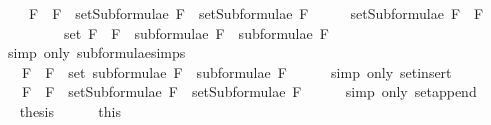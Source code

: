 \begin{isabellebody}
\ \ \ {\isacharequal}\ {\isacharbraceleft}F{}\ \isactrlbold {\isasymand}\ F{}{\isacharbraceright}\ {\isasymunion}\ {\isacharparenleft}setSubformulae\ F{}\ {\isasymunion}\ setSubformulae\ F{}{\isacharparenright}{\isachardoublequoteclose}\isanewline
%
\isadelimproof
%
\endisadelimproof
%
\isatagproof
{}\isamarkupfalse%
\ {\isacharminus}\isanewline
\ \ \isamarkupfalse%
\ {\isachardoublequoteopen}setSubformulae\ {\isacharparenleft}F{}\ \isactrlbold {\isasymand}\ F{}{\isacharparenright}\ \isanewline
\ \ \ \ \ \ \ \ {\isacharequal}\ set\ {\isacharparenleft}{\isacharparenleft}F{}\ \isactrlbold {\isasymand}\ F{}{\isacharparenright}\ {\isacharhash}\ {\isacharparenleft}subformulae\ F{}\ {\isacharat}\ subformulae\ F{}{\isacharparenright}{\isacharparenright}{\isachardoublequoteclose}\isanewline
\ \ \ \ \isamarkupfalse%
\ {\isacharparenleft}simp\ only{\isacharcolon}\ subformulae{\isachardot}simps{\isacharparenleft}{}{\isacharparenright}{\isacharparenright}\isanewline
\ \ \isamarkupfalse%
\ \isamarkupfalse%
\ {\isachardoublequoteopen}{\isasymdots}\ {\isacharequal}\ {\isacharbraceleft}F{}\ \isactrlbold {\isasymand}\ F{}{\isacharbraceright}\ {\isasymunion}\ {\isacharparenleft}set\ {\isacharparenleft}subformulae\ F{}\ {\isacharat}\ subformulae\ F{}{\isacharparenright}{\isacharparenright}{\isachardoublequoteclose}\isanewline
\ \ \ \ \isamarkupfalse%
\ {\isacharparenleft}simp\ only{\isacharcolon}\ set{\isacharunderscore}insert{\isacharparenright}\isanewline
\ \ \isamarkupfalse%
\ \isamarkupfalse%
\ {\isachardoublequoteopen}{\isasymdots}\ {\isacharequal}\ {\isacharbraceleft}F{}\ \isactrlbold {\isasymand}\ F{}{\isacharbraceright}\ {\isasymunion}\ {\isacharparenleft}setSubformulae\ F{}\ {\isasymunion}\ setSubformulae\ F{}{\isacharparenright}{\isachardoublequoteclose}\isanewline
\ \ \ \ \isamarkupfalse%
\ {\isacharparenleft}simp\ only{\isacharcolon}\ set{\isacharunderscore}append{\isacharparenright}\isanewline
\ \ \isamarkupfalse%
\ \isamarkupfalse%
\ {\isacharquery}thesis\isanewline
\ \ \ \ \isamarkupfalse%
\ this\isanewline
{}\isamarkupfalse%
%
\endisatagproof
{\isafoldproof}%
%
\isadelimproof
\isanewline
%
\endisadelimproof
\isanewline
{}\isamarkupfalse%

\end{isabellebody}
